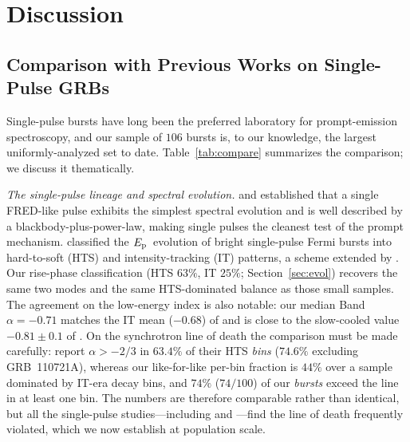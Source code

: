 \documentclass[twocolumn]{aastex631}
\newcommand{\Ep}{\ensuremath{E_{\rm p}}}
\begin{document}

\section{Discussion} \label{sec:discussion}
\subsection{Comparison with Previous Works on Single-Pulse GRBs}
\label{sec:disc-compare}
Single-pulse bursts have long been the preferred laboratory for prompt-emission
spectroscopy, and our sample of $106$ bursts is, to our knowledge, the largest
uniformly-analyzed set to date. Table~\ref{tab:compare} summarizes the
comparison; we discuss it thematically.

\emph{The single-pulse lineage and spectral evolution.}
\citet{Ryde2004} and \citet{RydePeer2009} established that a single FRED-like
pulse exhibits the simplest spectral evolution and is well described by a
blackbody-plus-power-law, making single pulses the cleanest test of the prompt
mechanism. \citet{Lu2012} classified the \Ep\ evolution of bright single-pulse
Fermi bursts into hard-to-soft (HTS) and intensity-tracking (IT) patterns, a
scheme extended by \citet{Basak2013,Basak2014}. Our rise-phase classification
(HTS $63\%$, IT $25\%$; Section~\ref{sec:evol}) recovers the same two modes and
the same HTS-dominated balance as those small samples. The agreement on the
low-energy index is also notable: our median Band $\alpha=-0.71$ matches the IT
mean ($-0.68$) of \citet{Basak2014} and is close to the slow-cooled value
$-0.81\pm0.1$ of \citet{Burgess2014b}. On the synchrotron line of death the
comparison must be made carefully: \citet{Basak2014} report $\alpha>-2/3$ in
$63.4\%$ of their HTS \emph{bins} ($74.6\%$ excluding GRB~110721A), whereas our
like-for-like per-bin fraction is $44\%$ over a sample dominated by IT-era
decay bins, and $74\%$ ($74/100$) of our \emph{bursts} exceed the line in at
least one bin. The numbers are therefore comparable rather than identical, but
all the single-pulse studies---including \citet{Basak2013} and
\citet{Guiriec2010}---find the line of death frequently violated, which we now
establish at population scale.
\end{document}
